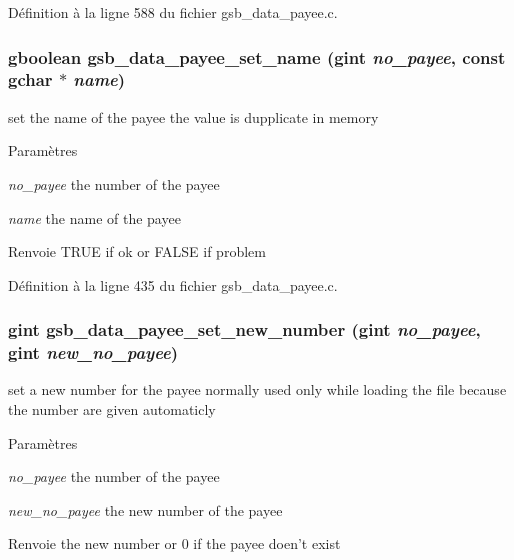 Définition à la ligne 588 du fichier gsb\_\-data\_\-payee.c.

\subsubsection[{gsb\_\-data\_\-payee\_\-set\_\-name}]{\setlength{\rightskip}{0pt plus 5cm}gboolean gsb\_\-data\_\-payee\_\-set\_\-name (gint {\em no\_\-payee}, \/  const gchar $\ast$ {\em name})}\label{gsb__data__payee_8h_a1763e422eefc268ed8f9c74a80a011ba}
set the name of the payee the value is dupplicate in memory


\begin{DoxyParams}{Paramètres}
\item[{\em no\_\-payee}]the number of the payee \item[{\em name}]the name of the payee\end{DoxyParams}
\begin{DoxyReturn}{Renvoie}
TRUE if ok or FALSE if problem 
\end{DoxyReturn}


Définition à la ligne 435 du fichier gsb\_\-data\_\-payee.c.

\subsubsection[{gsb\_\-data\_\-payee\_\-set\_\-new\_\-number}]{\setlength{\rightskip}{0pt plus 5cm}gint gsb\_\-data\_\-payee\_\-set\_\-new\_\-number (gint {\em no\_\-payee}, \/  gint {\em new\_\-no\_\-payee})}\label{gsb__data__payee_8h_a2797848d26057d372b174468814924be}
set a new number for the payee normally used only while loading the file because the number are given automaticly


\begin{DoxyParams}{Paramètres}
\item[{\em no\_\-payee}]the number of the payee \item[{\em new\_\-no\_\-payee}]the new number of the payee\end{DoxyParams}
\begin{DoxyReturn}{Renvoie}
the new number or 0 if the payee doen't exist 
\end{DoxyReturn}


